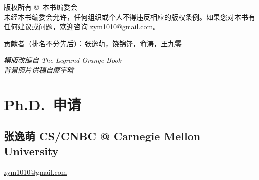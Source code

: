 \documentclass[11pt,fleqn,openany]{book} %
\begin{document}
\noindent 版权所有 \copyright\ 本书编委会\\ %
未经本书编委会允许，任何组织或个人不得违反相应的版权条例。如果您对本书有任何建议或问题，欢迎咨询 \href{mailto:zym1010@gmail.com}{zym1010@gmail.com}。



\noindent 贡献者（排名不分先后）：张逸萌，饶锦锋，俞涛，王九零 %

\noindent \textit{模版改编自 The Legrand Orange Book}\\%
\textit{背景照片供稿自廖宇晗} %




\pagestyle{empty} %


\setcounter{tocdepth}{1}
\tableofcontents %

\cleardoublepage %

\pagestyle{fancy} %



\cleardoublepage
\chapter{Ph.D.~申请}

\section{张逸萌 CS/CNBC @ Carnegie Mellon University}
\hfill \href{mailto:zym1010@gmail.com}{zym1010@gmail.com}
\end{document}
